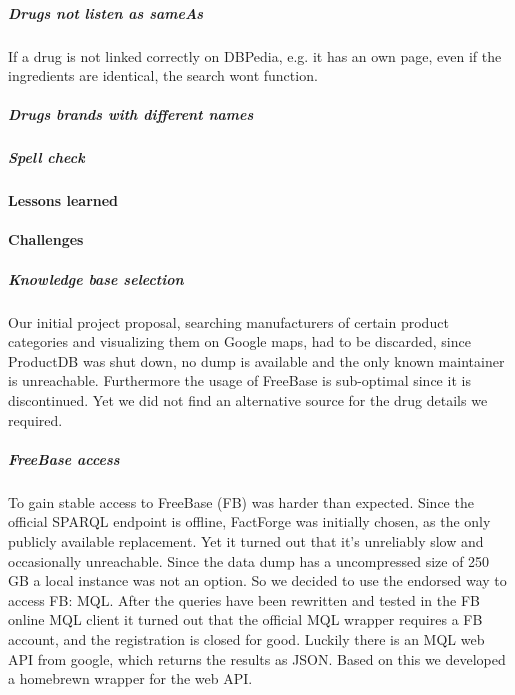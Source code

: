 \documentclass[11pt,titlepage,oneside,openany]{book}
\begin{document}
\subparagraph{Drugs not listen as sameAs}
\label{drug_sameAs}
If a drug is not linked correctly on DBPedia, e.g. it has an own page, even if the ingredients are identical, the search wont function.

\subparagraph{Drugs brands with different names}
\label{drug_foregin_name}

\subparagraph{Spell check}
\label{drug_spellcheck}

\paragraph{Lessons learned}
\label{cha:lessons}




\paragraph{Challenges}
\label{challenges}

\subparagraph{Knowledge base selection} Our initial project proposal, searching manufacturers of certain product categories and visualizing them on Google maps, had to be discarded, since ProductDB was shut down, no dump is available and the only known maintainer is unreachable. Furthermore the usage of FreeBase is sub-optimal since it is discontinued. Yet we did not find an alternative source for the drug details we required. 


\subparagraph{FreeBase access}
\label{challenges:fb}
To gain stable access to FreeBase (FB) was harder than expected. Since the official SPARQL endpoint is offline, FactForge was initially chosen, as the only publicly available replacement. Yet it turned out that it's unreliably slow and occasionally unreachable. Since the data dump has a uncompressed size of 250 GB a local instance was not an option. 
So we decided to use the endorsed way to access FB: MQL. After the queries have been rewritten and tested in the FB online MQL client it turned out that the official MQL wrapper requires a FB account, and the registration is closed for good.
Luckily there is an MQL web API from google, which returns the results as JSON. Based on this we developed a homebrewn wrapper for the web API.



\appendix

\newpage
\end{document}
